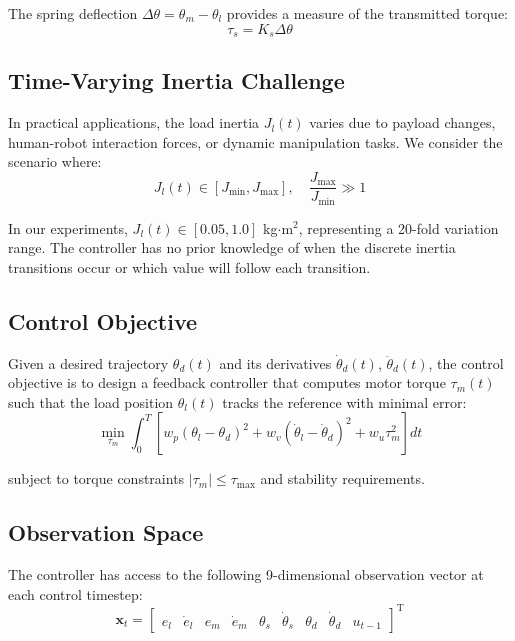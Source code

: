 \documentclass[letterpaper,journal]{IEEEtran}
\begin{document}
The spring deflection $\Delta\theta = \theta_m - \theta_l$ provides a measure of the transmitted torque:
\begin{equation}
\tau_s = K_s \Delta\theta \label{eq:spring_torque}
\end{equation}

\subsection{Time-Varying Inertia Challenge}

In practical applications, the load inertia $J_l(t)$ varies due to payload changes, human-robot interaction forces, or dynamic manipulation tasks. We consider the scenario where:
\begin{equation}
J_l(t) \in [J_{\min}, J_{\max}], \quad \frac{J_{\max}}{J_{\min}} \gg 1 \label{eq:inertia_range}
\end{equation}

In our experiments, $J_l(t) \in [0.05, 1.0]$ kg$\cdot$m$^2$, representing a 20-fold variation range. The controller has no prior knowledge of when the discrete inertia transitions occur or which value will follow each transition.

\subsection{Control Objective}

Given a desired trajectory $\theta_d(t)$ and its derivatives $\dot{\theta}_d(t)$, $\ddot{\theta}_d(t)$, the control objective is to design a feedback controller that computes motor torque $\tau_m(t)$ such that the load position $\theta_l(t)$ tracks the reference with minimal error:
\begin{equation}
\min_{\tau_m} \int_0^T \left[ w_p(\theta_l - \theta_d)^2 + w_v(\dot{\theta}_l - \dot{\theta}_d)^2 + w_u \tau_m^2 \right] dt \label{eq:objective}
\end{equation}

\noindent subject to torque constraints $|\tau_m| \leq \tau_{\max}$ and stability requirements.

\subsection{Observation Space}

The controller has access to the following 9-dimensional observation vector at each control timestep:
\begin{equation}
\bm{x}_t = \begin{bmatrix}
e_{l} & \dot{e}_{l} & e_{m} & \dot{e}_{m} & \theta_s & \dot{\theta}_s & \theta_d & \dot{\theta}_d & u_{t-1}
\end{bmatrix}^\mathrm{T} \label{eq:observation}
\end{equation}
\end{document}
